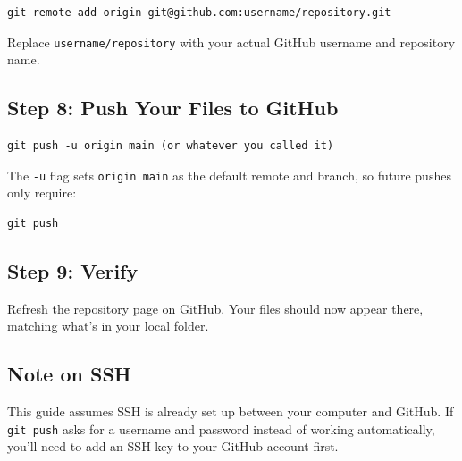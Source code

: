\documentclass[../main.tex]{subfiles}
\begin{document}
\begin{lstlisting}
git remote add origin git@github.com:username/repository.git
\end{lstlisting}

Replace \texttt{username/repository} with your actual GitHub
username and repository name.

\subsection{Step 8: Push Your Files to GitHub}
\begin{lstlisting}
git push -u origin main (or whatever you called it)
\end{lstlisting}

The \texttt{-u} flag sets \texttt{origin main} as the default
remote and branch, so future pushes only require:

\begin{lstlisting}
git push
\end{lstlisting}

\subsection{Step 9: Verify}
Refresh the repository page on GitHub. Your files should now
appear there, matching what's in your local folder.

\subsection{Note on SSH}
This guide assumes SSH is already set up between your computer
and GitHub. If \texttt{git push} asks for a username and password
instead of working automatically, you'll need to add an SSH key
to your GitHub account first.
\end{document}
